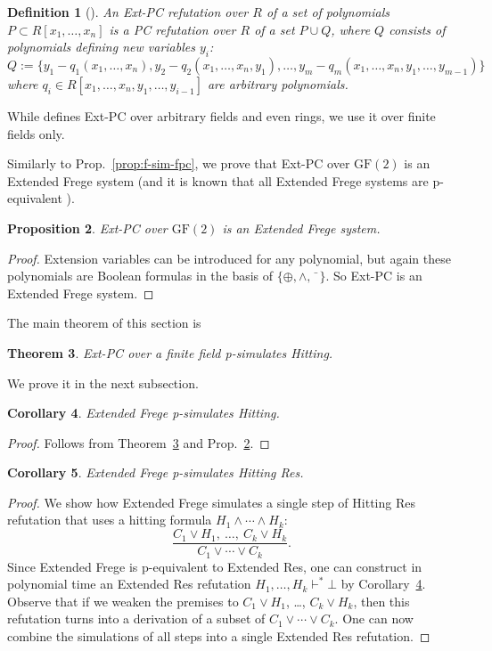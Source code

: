 \documentclass[11pt]{article}
\newcommand{\scterm}[1]{{\textrm{\sc #1}}}
\newcommand{\hit}{\scterm{Hitting}}
\newcommand{\res}{\scterm{Res}}
\newcommand{\F}{\scterm{Frege}}
\newcommand{\EF}{\scterm{Extended {\F}}}
\newcommand{\extres}{\scterm{Extended {\res}}}
\newcommand{\extpc}{\scterm{Ext-PC}}
\newcommand{\pc}{\scterm{PC}}
\newcommand{\hitres}{{\hit} {\res}}
\newcommand{\GF}{\mathrm{GF}}
\numberwithin{equation}{section}
\newtheorem{theorem}{Theorem}[section]
\newtheorem{proposition}[theorem]{Proposition}
\newtheorem{corollary}[theorem]{Corollary}
\newtheorem{definition}[theorem]{Definition}
\begin{document}
\begin{definition}[\cite{Ale21}]\label{def:extpc}
An {\extpc} refutation over $R$ of a set of polynomials $P\subset R[x_1,\dotsc,x_n]$
is a {\pc} refutation over $R$ of a set $P\cup Q$,
where $Q$ consists of polynomials defining new variables $y_i$: 
\[
Q := \{y_1 - q_1(x_1, \dotsc, x_n), y_2 - q_2(x_1, \dotsc, x_n, y_1), \dotsc, 
y_m - q_m(x_1, \dotsc, x_n, y_1, \dotsc, y_{m - 1})\}
\]
where $q_i \in R[x_1,\dotsc,x_n, y_1, \dotsc, y_{i - 1}]$ are arbitrary polynomials. 
\end{definition}
While \cite{Ale21} defines {\extpc} over arbitrary fields and even rings, 
we use it over finite fields only.

Similarly to Prop.~\ref{prop:f-sim-fpc}, we prove that {\extpc} over $\GF(2)$ is an {\EF} system
(and it is known that
all {\EF} systems are p-equivalent \cite[Theorem 5.3.2.a]{Rec76}).
\begin{proposition}\label{prop:ef-sim-extpc}
{\extpc} over $\GF(2)$ is an {\EF} system.
\end{proposition}
\begin{proof}
Extension variables can be introduced for any polynomial,
but again these polynomials are Boolean formulas in the basis of $\{\oplus,\land,\bar{\phantom{x}}\}$.
So {\extpc} is an {\EF} system.
\end{proof}


The main theorem of this section is

\begin{theorem}\label{th:extpc-sim-hit}
{\extpc} over a finite field p-simulates {\hit}.
\end{theorem}

We prove it in the next subsection.

\begin{corollary}\label{cor:ef-sim-hit}
{\EF} p-simulates {\hit}.
\end{corollary}
\begin{proof}
Follows from Theorem~\ref{th:extpc-sim-hit} and Prop.~\ref{prop:ef-sim-extpc}.
\end{proof}

\begin{corollary}\label{cor:ef-sim-hitres}
{\EF} p-simulates {\hitres}.
\end{corollary}
\begin{proof}
We show how {\EF} simulates a single step of {\hitres} refutation that uses a hitting formula $H_1\land\dotsb\land H_k$:
\[
\frac{C_1\lor H_1,\ \dotsc,\ C_k\lor H_k}{C_1\lor\dotsb\lor C_k}.
\]
Since {\EF} is p-equivalent to {\extres}, one can construct in polynomial time an {\extres} refutation $H_1,\dotsc,H_k\vdash^* \bot$ by Corollary~\ref{cor:ef-sim-hit}.
Observe that if we weaken the premises to $C_1\lor H_1$, \ldots, $C_k\lor H_k$,
then this refutation turns into a derivation of a subset of $C_1\lor\dotsb\lor C_k$.
One can now combine the simulations of all steps into a single {\extres} refutation.
\end{proof}
\end{document}
